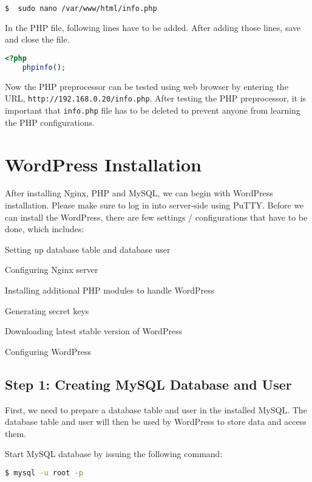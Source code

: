 \begin{lstlisting}[language=sh]
$  sudo nano /var/www/html/info.php
\end{lstlisting}

In the PHP file, following lines have to be added. After adding those lines, save and close the file.
\begin{lstlisting}[language=PHP]
<?php
    phpinfo();
\end{lstlisting}

Now the PHP preprocessor can be tested using web browser by entering the URL, \texttt{http://192.168.0.20/info.php}. After testing the PHP preprocessor, it is important that \texttt{info.php} file has to be deleted to prevent anyone from learning the PHP configurations.

\section{WordPress Installation} \label{sec:wordpress-installation}
After installing Nginx, PHP and MySQL, we can begin with WordPress installation. Please make sure to log in into server-side using PuTTY. Before we can install the WordPress, there are few settings / configurations that have to be done, which includes:
\begin{itemize*}
\item Setting up database table and database user
\item Configuring Nginx server
\item Installing additional PHP modules to handle WordPress
\item Generating secret keys
\item Downloading latest stable version of WordPress
\item Configuring WordPress
\end{itemize*}

\subsection*{Step 1: Creating MySQL Database and User}

First, we need to prepare a database table and user in the installed MySQL. The database table and user will then be used by WordPress to store data and access them.

Start MySQL database by issuing the following command:

\begin{lstlisting}[language=sh]
$ mysql -u root -p
\end{lstlisting}

